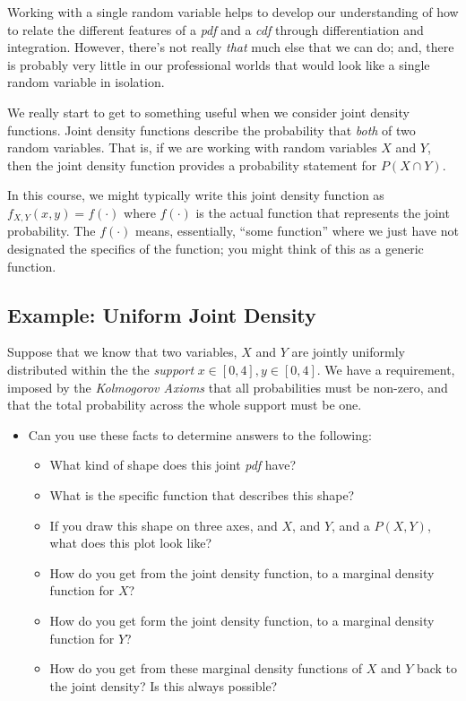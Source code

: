 \documentclass[
  letterpaper,
  DIV=11,
  numbers=noendperiod]{scrreprt}
\providecommand{\tightlist}{%
  \setlength{\itemsep}{0pt}\setlength{\parskip}{0pt}}\usepackage{longtable,booktabs,array}
\begin{document}
Working with a single random variable helps to develop our understanding
of how to relate the different features of a \emph{pdf} and a \emph{cdf}
through differentiation and integration. However, there's not really
\emph{that} much else that we can do; and, there is probably very little
in our professional worlds that would look like a single random variable
in isolation.

We really start to get to something useful when we consider joint
density functions. Joint density functions describe the probability that
\emph{both} of two random variables. That is, if we are working with
random variables \(X\) and \(Y\), then the joint density function
provides a probability statement for \(P(X \cap Y)\).

In this course, we might typically write this joint density function as
\(f_{X,Y}(x,y) = f(\cdot)\) where \(f(\cdot)\) is the actual function
that represents the joint probability. The \(f(\cdot)\) means,
essentially, ``some function'' where we just have not designated the
specifics of the function; you might think of this as a generic
function.

\subsection{Example: Uniform Joint
Density}\label{example-uniform-joint-density}

Suppose that we know that two variables, \(X\) and \(Y\) are jointly
uniformly distributed within the the \emph{support}
\(x \in [0,4], y \in [0,4]\). We have a requirement, imposed by the
\emph{Kolmogorov Axioms} that all probabilities must be non-zero, and
that the total probability across the whole support must be one.

\begin{itemize}
\tightlist
\item
  Can you use these facts to determine answers to the following:

  \begin{itemize}
  \tightlist
  \item
    What kind of shape does this joint \emph{pdf} have?
  \item
    What is the specific function that describes this shape?
  \item
    If you draw this shape on three axes, and \(X\), and \(Y\), and a
    \(P(X,Y)\), what does this plot look like?
  \item
    How do you get from the joint density function, to a marginal
    density function for \(X\)?
  \item
    How do you get form the joint density function, to a marginal
    density function for \(Y\)?
  \item
    How do you get from these marginal density functions of \(X\) and
    \(Y\) back to the joint density? Is this always possible?
  \end{itemize}
\end{itemize}
\end{document}
